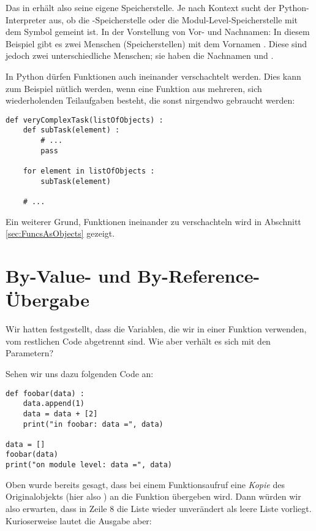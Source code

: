 Das  in  erhält also seine eigene Speicherstelle. Je nach Kontext sucht der Python-Interpreter aus, ob die -Speicherstelle oder die Modul-Level-Speicherstelle mit dem Symbol  gemeint ist. In der Vorstellung von Vor- und Nachnamen: In diesem Beispiel gibt es zwei Menschen (Speicherstellen) mit dem Vornamen . Diese sind jedoch zwei unterschiedliche Menschen; sie haben die Nachnamen  und .

In Python dürfen Funktionen auch ineinander verschachtelt werden. Dies kann zum Beispiel nütlich werden, wenn eine Funktion aus mehreren, sich wiederholenden Teilaufgaben besteht, die sonst nirgendwo gebraucht werden:

\begin{codebox}
\begin{verbatim}
def veryComplexTask(listOfObjects) :
    def subTask(element) :
        # ...
        pass
    
    for element in listOfObjects :
        subTask(element)
  
    # ...
\end{verbatim}
\end{codebox}

Ein weiterer Grund, Funktionen ineinander zu verschachteln wird in Abschnitt \ref{sec:FuncsAsObjects} gezeigt.

\section{By-Value- und By-Reference-Übergabe}
Wir hatten festgestellt, dass die Variablen, die wir in einer Funktion verwenden, vom restlichen Code abgetrennt sind. Wie aber verhält es sich mit den Parametern?

Sehen wir uns dazu folgenden Code an:
\begin{codebox}
\begin{verbatim}
def foobar(data) :
    data.append(1)
    data = data + [2]
    print("in foobar: data =", data)

data = []
foobar(data)
print("on module level: data =", data)
\end{verbatim}
\end{codebox}
Oben wurde bereits gesagt, dass bei einem Funktionsaufruf eine \emph{Kopie} des Originalobjekts (hier also ) an die Funktion übergeben wird. Dann würden wir also erwarten, dass in Zeile 8 die Liste  wieder unverändert als leere Liste vorliegt. Kurioserweise lautet die Ausgabe aber:

